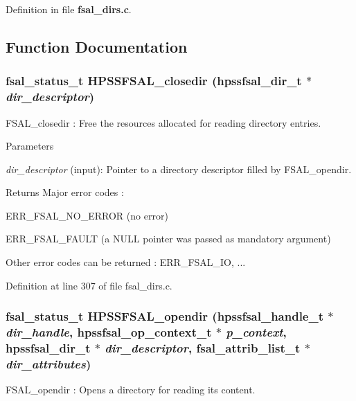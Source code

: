 Definition in file {\bf fsal\_\-dirs.c}.

\subsection{Function Documentation}
\subsubsection[{HPSSFSAL\_\-closedir}]{\setlength{\rightskip}{0pt plus 5cm}fsal\_\-status\_\-t HPSSFSAL\_\-closedir (hpssfsal\_\-dir\_\-t $\ast$ {\em dir\_\-descriptor})}\label{fsal__dirs_8c_a8347fe62bde5d79f93a016ee0087ec4a}
FSAL\_\-closedir : Free the resources allocated for reading directory entries.


\begin{DoxyParams}{Parameters}
\item[{\em dir\_\-descriptor}](input): Pointer to a directory descriptor filled by FSAL\_\-opendir.\end{DoxyParams}
\begin{DoxyReturn}{Returns}
Major error codes :
\begin{DoxyItemize}
\item ERR\_\-FSAL\_\-NO\_\-ERROR (no error)
\item ERR\_\-FSAL\_\-FAULT (a NULL pointer was passed as mandatory argument)
\item Other error codes can be returned : ERR\_\-FSAL\_\-IO, ... 
\end{DoxyItemize}
\end{DoxyReturn}


Definition at line 307 of file fsal\_\-dirs.c.
\subsubsection[{HPSSFSAL\_\-opendir}]{\setlength{\rightskip}{0pt plus 5cm}fsal\_\-status\_\-t HPSSFSAL\_\-opendir (hpssfsal\_\-handle\_\-t $\ast$ {\em dir\_\-handle}, \/  hpssfsal\_\-op\_\-context\_\-t $\ast$ {\em p\_\-context}, \/  hpssfsal\_\-dir\_\-t $\ast$ {\em dir\_\-descriptor}, \/  fsal\_\-attrib\_\-list\_\-t $\ast$ {\em dir\_\-attributes})}\label{fsal__dirs_8c_ad74771cb884cb7b3d3022c9d84d00b73}
FSAL\_\-opendir : Opens a directory for reading its content.


